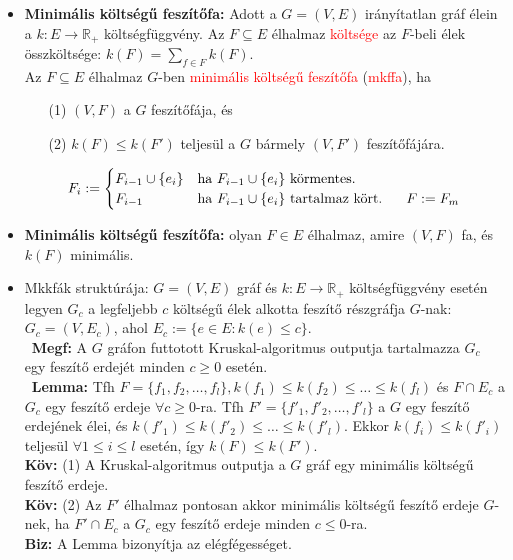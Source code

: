 \documentclass[../../szobeli.tex]{subfiles}
\begin{document}
    \begin{center}
        \noindent{}
    \end{center}

    \begin{itemize}
        \item \textbf{Minimális költségű feszítőfa:} Adott a $G = (V,E)$ irányítatlan gráf élein a $k:E \rightarrow \mathbb{R}_+$ költségfüggvény. Az $F \subseteq E$ élhalmaz \textcolor{red}{költsége} az $F$-beli élek összköltsége: $k(F) = \sum_{f\in F}k(F)$. \\ Az $F \subseteq E$ élhalmaz $G$-ben \textcolor{red}{minimális költségű feszítőfa} (\textcolor{red}{mkffa}), ha \begin{itemize}
            \item[(1)] $(V,F)$ a $G$ feszítőfája, és
            \item[(2)] $k(F) \leq k(F')$ teljesül a $G$ bármely $(V,F')$ feszítőfájára.
        \end{itemize}
        \begin{equation*}
            F_i :=\begin{cases}
                F_{i-1}\cup \{e_i\} & \text{ha $F_{i-1}\cup \{e_i\}$ körmentes.} \\
                F_{i-1} & \text{ha $F_{i-1}\cup \{e_i\}$ tartalmaz kört. \;\;\; $F:=F_m$}
            \end{cases}
        \end{equation*}
        \item \textbf{Minimális költségű feszítőfa:} olyan $F\in E$ élhalmaz, amire $(V,F)$ fa, és $k(F)$ minimális.
        \item Mkkfák struktúrája: $G=(V,E)$ gráf és $k:E \rightarrow \mathbb{R}_+$ költségfüggvény esetén legyen $G_c$ a legfeljebb $c$ költségű élek alkotta feszítő részgráfja $G$-nak: $G_c = (V,E_c)$, ahol $E_c := \{e \in E : k(e)\leq c\}$. \\ \textbf{Megf:} A $G$ gráfon futtotott Kruskal-algoritmus outputja tartalmazza $G_c$ egy feszítő erdejét minden $c \geq 0$ esetén. \\ \textbf{Lemma:} Tfh $F=\{f_1,f_2,\dots,f_l\}, k(f_1) \leq k(f_2) \leq \dots \leq k(f_l)$ és $F\cap E_c$ a $G_c$ egy feszítő erdeje $\forall c \geq 0$-ra. Tfh $F' = \{f'_1, f'_2,\dots,f'_l\}$ a $G$ egy feszítő erdejének élei, és $k(f'_1) \leq k(f'_2) \leq \dots \leq k(f'_l)$. Ekkor $k(f_i) \leq k(f'_i)$ teljesül $\forall 1 \leq i \leq l$ esetén, így $k(F) \leq k(F')$. \\ \textbf{Köv:} (1) A Kruskal-algoritmus outputja a $G$ gráf egy minimális költségű feszítő erdeje. \\ \textbf{Köv:} (2) Az $F'$ élhalmaz pontosan akkor minimális költségű feszítő erdeje $G$-nek, ha $F' \cap E_c$ a $G_c$ egy feszítő erdeje minden $c \leq 0$-ra. \\ \textbf{Biz:} A Lemma bizonyítja az elégfégességet.

\end{itemize}
\end{document}

